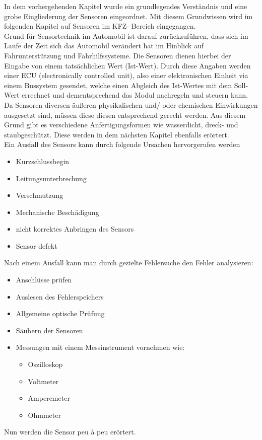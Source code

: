 			\begin{flushleft}
				In dem vorhergehenden Kapitel wurde ein grundlegendes Verständnis und eine grobe Eingliederung der Sensoren eingeordnet. Mit diesem Grundwissen wird im folgenden Kapitel auf Sensoren im KFZ- Bereich eingegangen.\\
				Grund für Sensortechnik im Automobil ist darauf zurückzuführen, dass sich im Laufe der Zeit sich das Automobil verändert hat im Hinblick auf Fahrunterstützung und Fahrhilfssysteme.
				Die Sensoren dienen hierbei der Eingabe von einem tatsächlichen Wert (Ist-Wert). Durch diese Angaben werden einer ECU (electronically controlled unit), also einer elektronischen Einheit via einem Bussystem gesendet, welche einen Abgleich des Ist-Wertes mit dem Soll-Wert errechnet und dementsprechend das Modul nachregeln und steuern kann. \\ 
				Da Sensoren diversen äußeren physikalischen und/ oder chemischen Einwirkungen ausgesetzt sind, müssen diese diesen entsprechend gerecht werden. Aus diesem Grund gibt es verschiedene Anfertigungsformen wie wasserdicht, dreck- und staubgeschützt. Diese werden in dem nächsten Kapitel ebenfalls erörtert.\\  
				
				Ein Ausfall des Sensors kann durch folgende Ursachen hervorgerufen werden
				\begin{itemize}
					\item Kurzschlussbegin
					\item Leitungsunterbrechung
					\item Verschmutzung
					\item Mechanische Beschädigung
					\item nicht korrektes Anbringen des Sensors
					\item Sensor defekt
				\end{itemize}	
				
				Nach einem Ausfall kann man durch gezielte Fehlersuche den Fehler analysieren:
				\begin{itemize}
					\item Anschlüsse prüfen
					\item Auslesen des Fehlerspeichers
					\item Allgemeine optische Prüfung
					\item Säubern der Sensoren
					\item Messungen mit einem Messinstrument vornehmen wie:
					\begin{itemize}
						\item Oszilloskop 
						\item Voltmeter
						\item Amperemeter
						\item Ohmmeter	
					\end{itemize}
					
				\end{itemize}					

				Nun werden die Sensor peu à peu erörtert. 



		\end{flushleft}	
		
